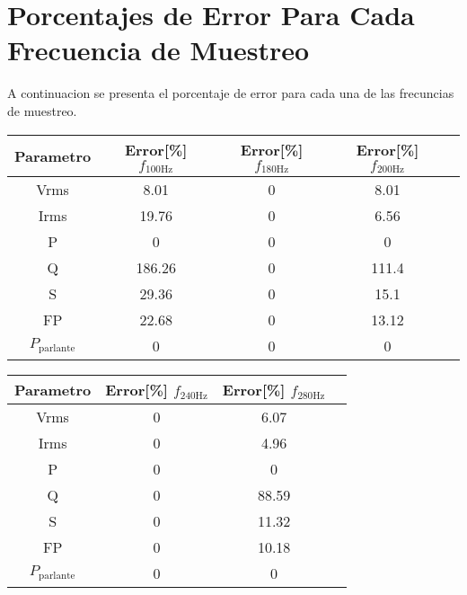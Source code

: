 
\section{Porcentajes de Error Para Cada Frecuencia de Muestreo}
A continuacion se presenta el porcentaje de error para cada una de las frecuncias de muestreo.

\begin{tabular}{ccccc}
    \toprule
    \textbf{Parametro} & \textbf{Error[\%] $f_{\text{100Hz}}$} & \textbf{Error[\%] $f_{\text{180Hz}}$} & \textbf{Error[\%] $f_{\text{200Hz}}$} &  \\
    \midrule
    Vrms                  & 8.01   & 0 & 8.01 \\                     
    Irms                  & 19.76  & 0 & 6.56 \\
    P                     & 0      & 0 & 0  \\
    Q                     & 186.26 & 0 & 111.4\\
    S                     & 29.36  & 0 & 15.1\\
    FP                    & 22.68  & 0 & 13.12\\
    $P_{\text{parlante}}$ & 0      & 0 & 0 \\
    \bottomrule
    \end{tabular}

    \begin{tabular}{cccc}
        \toprule
        \textbf{Parametro} & \textbf{Error[\%] $f_{\text{240Hz}}$} & \textbf{Error[\%] $f_{\text{280Hz}}$} \\
        \midrule
        Vrms                  & 0 & 6.07 \\ 
        Irms                  & 0 & 4.96 \\
        P                     & 0 & 0 \\
        Q                     & 0 & 88.59 \\
        S                     & 0 & 11.32 \\
        FP                    & 0 & 10.18 \\
        $P_{\text{parlante}}$ & 0 & 0  \\
        \bottomrule
        \end{tabular}
